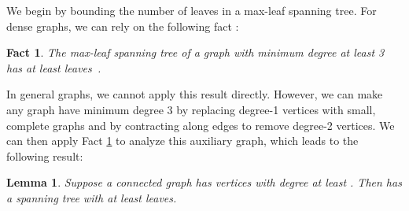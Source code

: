 \documentclass[letterpaper,twoside]{article}
\newtheorem{lemma}{Lemma}
\newtheorem{fact}{Fact}
\begin{document}
We begin by bounding the number of leaves in a max-leaf spanning
tree. For dense graphs, we can rely on the following fact
\cite{KW91,LR98}:
\begin{fact} \label{fact:maxleaf}
  The max-leaf spanning tree of a graph with minimum degree at least
  3 has at least  leaves~\cite{KW91,LR98}.
\end{fact}
In general graphs, we cannot apply this result directly. However,
we can make any graph have minimum degree 3 by replacing degree-1
vertices with small, complete graphs and by contracting along edges
to remove degree-2 vertices. We can then apply Fact \ref{fact:maxleaf}
to analyze this auxiliary graph, which leads to the following result:
\begin{lemma} \label{lemma:maxleaf}
    Suppose a connected graph  has  vertices with degree at
    least . Then  has a spanning tree with at least
     leaves.
\end{lemma}
\end{document}

